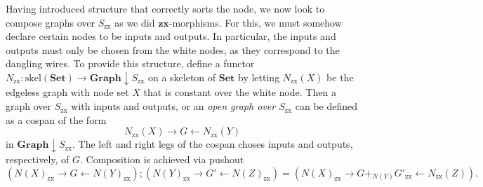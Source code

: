 \documentclass[submission,copyright,creativecommons]{eptcs}
\newcommand{\cat}[1]{\mathbf{#1}}
\newcommand{\from}{\colon}
\newcommand{\zx}{_{\text{zx}}}
\begin{document}
Having introduced structure that correctly sorts the node, we now look to compose graphs over $S\zx$ as we did $\cat{zx}$-morphisms.  For this, we must somehow declare certain nodes to be inputs and outputs.  In particular, the inputs and outputs must only be chosen from the white nodes, as they correspond to the dangling wires.  To provide this structure, define a functor $N\zx \from \text{skel}(\cat{Set}) \to \cat{Graph} \downarrow S\zx$ on a skeleton of $\cat{Set}$ by letting $N\zx (X)$ be the edgeless graph with node set $X$ that is constant over the white node.   Then a graph over $S\zx$ with inputs and outputs, or an \emph{open graph over $S\zx$} can be defined as a cospan of the form
\[
	N\zx (X) \to G \gets N\zx (Y)
\]
in $\cat{Graph} \downarrow S\zx$.  The left and right legs of the cospan choses inputs and outputs, respectively, of $G$. Composition is achieved via pushout
\[
	\left( N(X)\zx \to G \gets N(Y)\zx \right) ; 
	\left( N(Y)\zx \to G' \gets N(Z)\zx \right) =
	\left( N(X)\zx \to G +_{N(Y)} G'\zx \gets N\zx(Z) \right).
\]
\end{document}
